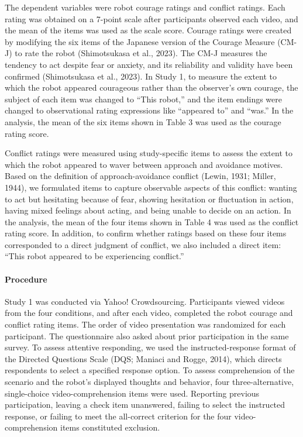 \documentclass[
]{article}
\begin{document}
The dependent variables were robot courage ratings and conflict ratings.
Each rating was obtained on a 7-point scale after participants observed
each video, and the mean of the items was used as the scale score.
Courage ratings were created by modifying the six items of the Japanese
version of the Courage Measure (CM-J) to rate the robot (Shimotsukasa et
al., 2023). The CM-J measures the tendency to act despite fear or
anxiety, and its reliability and validity have been confirmed
(Shimotsukasa et al., 2023). In Study 1, to measure the extent to which
the robot appeared courageous rather than the observer's own courage,
the subject of each item was changed to ``This robot,'' and the item
endings were changed to observational rating expressions like ``appeared
to'' and ``was.'' In the analysis, the mean of the six items shown in
Table 3 was used as the courage rating score.

Conflict ratings were measured using study-specific items to assess the
extent to which the robot appeared to waver between approach and
avoidance motives. Based on the definition of approach-avoidance
conflict (Lewin, 1931; Miller, 1944), we formulated items to capture
observable aspects of this conflict: wanting to act but hesitating
because of fear, showing hesitation or fluctuation in action, having
mixed feelings about acting, and being unable to decide on an action. In
the analysis, the mean of the four items shown in Table 4 was used as
the conflict rating score. In addition, to confirm whether ratings based
on these four items corresponded to a direct judgment of conflict, we
also included a direct item: ``This robot appeared to be experiencing
conflict.''

\paragraph{Procedure}\label{procedure}

Study 1 was conducted via Yahoo! Crowdsourcing. Participants viewed
videos from the four conditions, and after each video, completed the
robot courage and conflict rating items. The order of video presentation
was randomized for each participant. The questionnaire also asked about
prior participation in the same survey. To assess attentive responding,
we used the instructed-response format of the Directed Questions Scale
(DQS; Maniaci and Rogge, 2014), which directs respondents to select a
specified response option. To assess comprehension of the scenario and
the robot's displayed thoughts and behavior, four three-alternative,
single-choice video-comprehension items were used. Reporting previous
participation, leaving a check item unanswered, failing to select the
instructed response, or failing to meet the all-correct criterion for
the four video-comprehension items constituted exclusion.
\end{document}
